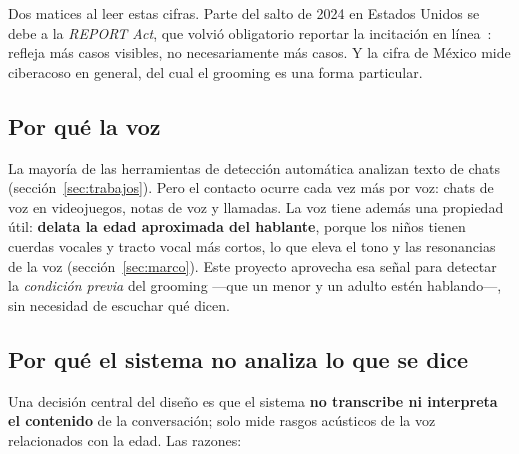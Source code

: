 \documentclass[11pt,a4paper]{article}
\begin{document}
Dos matices al leer estas cifras. Parte del salto de 2024 en Estados Unidos se debe a la \emph{REPORT Act}, que volvió obligatorio reportar la incitación en línea~\cite{thorn2025}: refleja más casos visibles, no necesariamente más casos. Y la cifra de México mide ciberacoso en general, del cual el grooming es una forma particular.

\subsection{Por qué la voz}

La mayoría de las herramientas de detección automática analizan texto de chats (sección~\ref{sec:trabajos}). Pero el contacto ocurre cada vez más por voz: chats de voz en videojuegos, notas de voz y llamadas. La voz tiene además una propiedad útil: \textbf{delata la edad aproximada del hablante}, porque los niños tienen cuerdas vocales y tracto vocal más cortos, lo que eleva el tono y las resonancias de la voz (sección~\ref{sec:marco}). Este proyecto aprovecha esa señal para detectar la \emph{condición previa} del grooming ---que un menor y un adulto estén hablando---, sin necesidad de escuchar qué dicen.

\subsection{Por qué el sistema no analiza lo que se dice}

Una decisión central del diseño es que el sistema \textbf{no transcribe ni interpreta el contenido} de la conversación; solo mide rasgos acústicos de la voz relacionados con la edad. Las razones:
\end{document}
